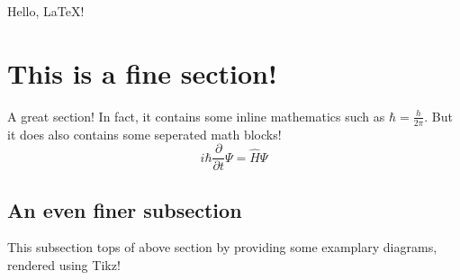 \documentclass{article}
\begin{document}
Hello, \LaTeX!

\section{This is a fine section!}
A great section! In fact, it contains some inline mathematics such as $\hbar = \frac{h}{2\pi}$. But it does also contains some seperated math blocks!
\begin{equation}
    i \hbar \frac{\partial}{\partial t} \Psi = \hat{H} \Psi
\end{equation}

\subsection{An even finer subsection}
This subsection tops of above section by providing some examplary diagrams, rendered using Tikz! \\

\begin{minipage}[t]{1.0\textwidth}  
    \begin{minipage}[t]{0.4\textwidth}
    \end{minipage}
    \begin{minipage}[t]{0.4\textwidth}
    \end{minipage}
\end{minipage}
\end{document}
